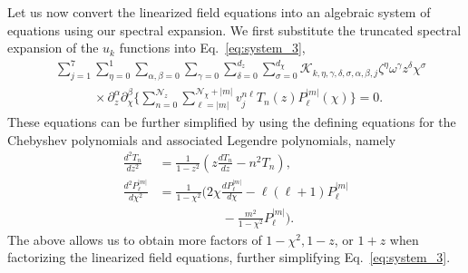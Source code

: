 \documentclass[aps,prx,amsmath,floats,floatfix,twocolumn,
  superscriptaddress,nofootinbib,showpacs]{revtex4-1}
\begin{document}
Let us now convert the linearized field equations into an algebraic system of equations using our spectral expansion. 
We first substitute the truncated spectral expansion of the $u_k$ functions into Eq.~\eqref{eq:system_3}, 
\begin{equation}\label{eq:system_4}
\begin{split}
& \sum_{j=1}^{7} \sum_{\eta = 0}^{1} \sum_{\alpha, \beta = 0} \sum_{\gamma=0} \sum_{\delta=0}^{d_{z}} \sum_{\sigma=0}^{d_{\chi}} \mathcal{K}_{k, \eta, \gamma, \delta, \sigma, \alpha, \beta, j} \zeta^{\eta}  \omega^\gamma z^{\delta} \chi^{\sigma} \\
& \quad \quad \quad \times \partial_{z}^{\alpha} \partial_{\chi}^{\beta} \Bigg\{\sum_{n=0}^{\mathcal{N}_z} \sum_{\ell=|m|}^{\mathcal{N}_{\chi}+|m|} v_j^{n \ell} T_{n}(z) P^{|m|}_{\ell}(\chi) \Bigg\} = 0.  
\end{split}
\end{equation}
These equations can be further simplified by using the defining equations for the Chebyshev polynomials and associated Legendre polynomials, namely
\begin{equation}
\begin{split}
\frac{d^2 T_n}{d z^2} & = \frac{1}{1-z^2} \left( z \frac{d T_n}{dz} - n^2 T_n \right), \\
\frac{d^2 P_{\ell}^{|m|}}{d \chi^2} & = \frac{1}{1-\chi^2} \Big( 2 \chi \frac{d P_{\ell}^{|m|}}{d \chi} - \ell(\ell+1) P_{\ell}^{|m|} \\
& \quad \quad \quad \quad \quad - \frac{m^2}{1-\chi^2} P_{\ell}^{|m|} \Big). 
\end{split}
\end{equation}
The above allows us to obtain more factors of $1-\chi^2, 1-z$, or $1+z$ when factorizing the linearized field equations, further simplifying Eq.~\eqref{eq:system_3}. 
\end{document}
